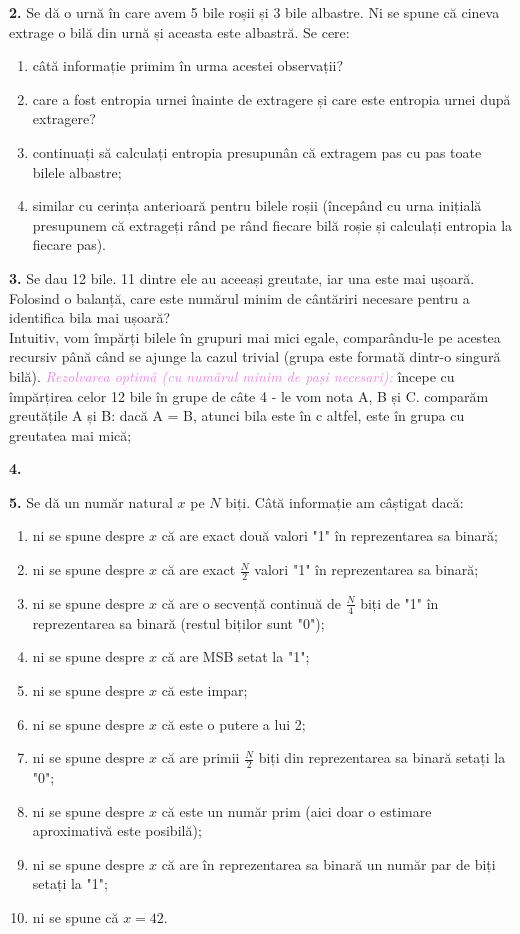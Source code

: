 \documentclass[a4paper]{article}
\newcommand{\hl}[1]{\textcolor{violet}{\textit{#1}}}
\begin{document}
\textbf{2.} Se dă o urnă în care avem 5 bile roșii și 3 bile albastre. Ni se spune că cineva extrage o bilă din urnă și aceasta este albastră. Se cere:
\begin{enumerate}[label=(\alph*)]
    \item câtă informație primim în urma acestei observații? \\
    \item care a fost entropia urnei înainte de extragere și care este entropia urnei după extragere? \\
    \item continuați să calculați entropia presupunân că extragem pas cu pas toate bilele albastre; \\
    \item similar cu cerința anterioară pentru bilele roșii (începând cu urna inițială presupunem că extrageți rând pe rând fiecare bilă roșie și calculați entropia la fiecare pas).
\end{enumerate}


\textbf{3.} Se dau 12 bile. 11 dintre ele au aceeași greutate, iar una este mai ușoară. Folosind o balanță, care este numărul minim de cântăriri necesare pentru a identifica bila mai ușoară? \\
\noindent Intuitiv, vom împărți bilele în grupuri mai mici egale, comparându-le pe acestea recursiv până când se ajunge la cazul trivial (grupa este formată dintr-o singură bilă). \hl{Rezolvarea optimă (cu numărul minim de pași necesari):}
începe cu împărțirea celor 12 bile în grupe de câte 4 - le vom nota A, B și C.
comparăm greutățile A și B:
    dacă A = B,
        atunci bila este în c
    altfel,
        este în grupa cu greutatea mai mică;

\textbf{4.}


\textbf{5.} Se dă un număr natural $x$ pe $N$ biți. Câtă informație am câștigat dacă:
\begin{enumerate}[label=(\alph*)]
    \item ni se spune despre $x$ că are exact două valori "1" în reprezentarea sa binară;
    \item ni se spune despre $x$ că are exact $\frac{N}{2}$ valori "1" în reprezentarea sa binară;
    \item ni se spune despre $x$ că are o secvență continuă de $\frac{N}{4}$ biți de "1" în reprezentarea sa binară (restul biților sunt "0");
    \item ni se spune despre $x$ că are MSB setat la "1";
    \item ni se spune despre $x$ că este impar;
    \item ni se spune despre $x$ că este o putere a lui 2;
    \item ni se spune despre $x$ că are primii $\frac{N}{2}$ biți din reprezentarea sa binară setați la "0";
    \item ni se spune despre $x$ că este un număr prim (aici doar o estimare aproximativă este posibilă);
    \item ni se spune despre $x$ că are în reprezentarea sa binară un număr par de biți setați la "1";
    \item ni se spune că $x = 42$.
\end{enumerate}
\end{document}
